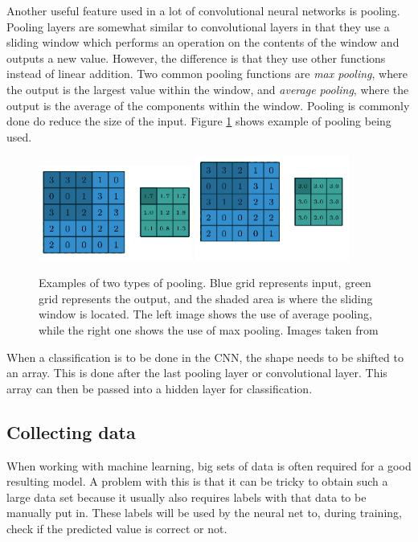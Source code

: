 
 Another useful feature used in a lot of convolutional neural networks is pooling. Pooling layers are somewhat similar to convolutional layers in that they use a sliding window which performs an operation on the contents of the window and outputs a new value. However, the difference is that they use other functions instead of linear addition. Two common pooling functions are \textit{max pooling}, where the output is the largest value within the window, and \textit{average pooling}, where the output is the average of the components within the window.  Pooling is commonly done do reduce the size of the input. Figure \ref{fig:pooling} shows example of pooling being used.
 
 \begin{figure}[hbtp]
\begin{center}
\includegraphics[width = 0.45\textwidth]{./Images/avgPool.png}
\includegraphics[width = 0.45\textwidth]{./Images/maxPool.png}
\caption{Examples of two types of pooling. Blue grid represents input, green grid represents the output, and the shaded area is where the sliding window is located. The left image shows the use of average pooling, while the right one shows the use of max pooling.
Images taken from \cite{convArit}}
\label{fig:pooling}
\end{center}
\end{figure} 
 
When a classification is to be done in the CNN, the shape needs to be shifted to an array. This is done after the last pooling layer or convolutional layer. This array can then be passed into a hidden layer for classification.


\subsection{Collecting data}
When working with machine learning, big sets of data is often required for a good resulting model.
A problem with this is that it can be tricky to obtain such a large data set because it usually also requires
labels with that data to be manually put in. These labels will be used by the neural net to, during training, check if
the predicted value is correct or not.

